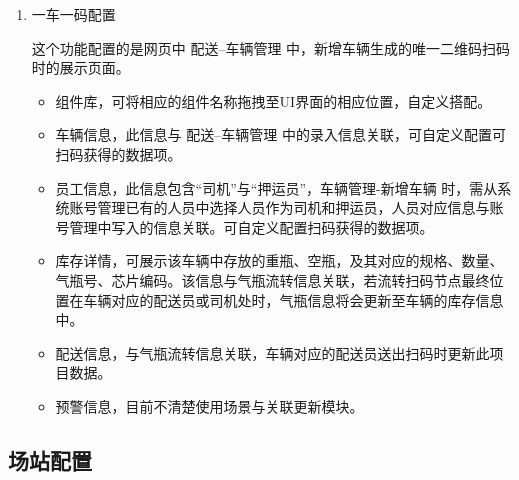 \documentclass[UTF8]{ctexart}
\begin{document}
\begin{enumerate}
	
	\item 一车一码配置
	
	这个功能配置的是网页中 配送--车辆管理 中，新增车辆生成的唯一二维码扫码时的展示页面。
	\begin{itemize}
		\item 组件库，可将相应的组件名称拖拽至UI界面的相应位置，自定义搭配。
		\item 车辆信息，此信息与 配送--车辆管理 中的录入信息关联，可自定义配置可扫码获得的数据项。
		\item 员工信息，此信息包含“司机”与“押运员”，车辆管理-新增车辆 时，需从系统账号管理已有的人员中选择人员作为司机和押运员，人员对应信息与账号管理中写入的信息关联。可自定义配置扫码获得的数据项。
		\item 库存详情，可展示该车辆中存放的重瓶、空瓶，及其对应的规格、数量、气瓶号、芯片编码。该信息与气瓶流转信息关联，若流转扫码节点最终位置在车辆对应的配送员或司机处时，气瓶信息将会更新至车辆的库存信息中。
		\item 配送信息，与气瓶流转信息关联，车辆对应的配送员送出扫码时更新此项目数据。
		\item 预警信息，目前不清楚使用场景与关联更新模块。
	\end{itemize}
	
	
\end{enumerate}


\subsection{场站配置}
\end{document}
